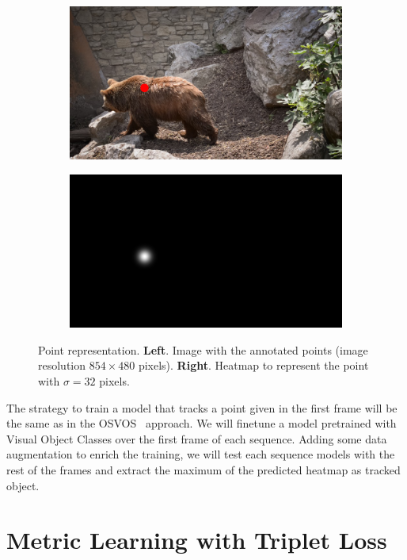 \begin{figure}[h]
  \centering
  \begin{subfigure}{.5\textwidth}
    \centering
    \includegraphics[width=.8\linewidth]{figures/methods/heatmaps/image_point.png}
  \end{subfigure}%
  \begin{subfigure}{.5\textwidth}
    \centering
    \includegraphics[width=.8\linewidth]{figures/methods/heatmaps/heatmap.png}
  \end{subfigure}
  \caption{
  Point representation.
  \textbf{Left}. Image with the annotated points (image resolution $854 \times 480$ pixels).
  \textbf{Right}. Heatmap to represent the point with $\sigma = 32$ pixels. }
  \label{fig:point_representation}
\end{figure}

The strategy to train a model that tracks a point given in the first frame will be the same as in the OSVOS~\cite{caelles2017one} approach.
We will finetune a model pretrained with Visual Object Classes over the first frame of each sequence.
Adding some data augmentation to enrich the training, we will test each sequence models with the rest of the frames and extract the maximum of the predicted heatmap as tracked object.



\section{Metric Learning with Triplet Loss}
\label{sec:methods_metriclearning}


